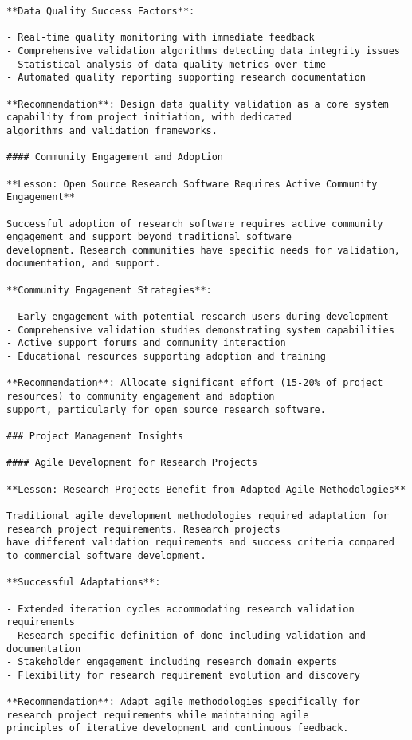 \documentclass[11pt,a4paper]{report}
\begin{document}
\begin{verbatim}
**Data Quality Success Factors**:

- Real-time quality monitoring with immediate feedback
- Comprehensive validation algorithms detecting data integrity issues
- Statistical analysis of data quality metrics over time
- Automated quality reporting supporting research documentation

**Recommendation**: Design data quality validation as a core system capability from project initiation, with dedicated
algorithms and validation frameworks.

#### Community Engagement and Adoption

**Lesson: Open Source Research Software Requires Active Community Engagement**

Successful adoption of research software requires active community engagement and support beyond traditional software
development. Research communities have specific needs for validation, documentation, and support.

**Community Engagement Strategies**:

- Early engagement with potential research users during development
- Comprehensive validation studies demonstrating system capabilities
- Active support forums and community interaction
- Educational resources supporting adoption and training

**Recommendation**: Allocate significant effort (15-20% of project resources) to community engagement and adoption
support, particularly for open source research software.

### Project Management Insights

#### Agile Development for Research Projects

**Lesson: Research Projects Benefit from Adapted Agile Methodologies**

Traditional agile development methodologies required adaptation for research project requirements. Research projects
have different validation requirements and success criteria compared to commercial software development.

**Successful Adaptations**:

- Extended iteration cycles accommodating research validation requirements
- Research-specific definition of done including validation and documentation
- Stakeholder engagement including research domain experts
- Flexibility for research requirement evolution and discovery

**Recommendation**: Adapt agile methodologies specifically for research project requirements while maintaining agile
principles of iterative development and continuous feedback.


\end{verbatim}
\end{document}
